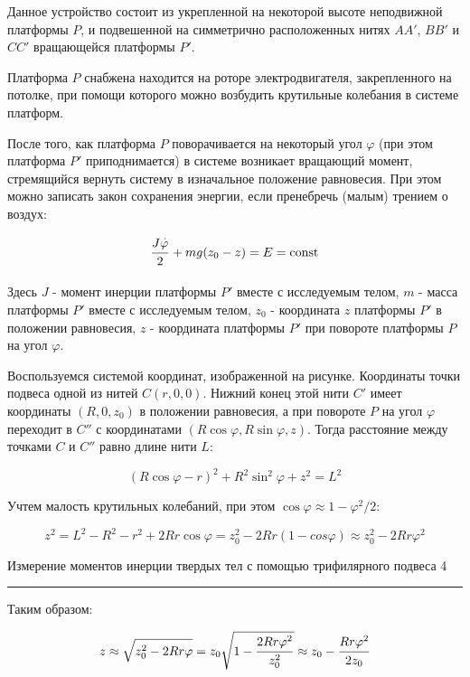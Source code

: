 \documentclass[12pt,a4paper]{scrartcl}
\begin{document}
	Данное устройство состоит из укрепленной на некоторой высоте неподвижной платформы $P$, и подвешенной на симметрично расположенных нитях $AA'$, $BB'$ и $CC'$ вращающейся платформы $P'$.
	
	Платформа $P$ снабжена находится на роторе электродвигателя, закрепленного на потолке, при помощи которого можно возбудить крутильные колебания в системе платформ.
	
	После того, как платформа $P$ поворачивается на некоторый угол $\varphi$ (при этом платформа $P'$ приподнимается) в системе возникает вращающий момент, стремящийся вернуть систему в изначальное положение равновесия. При этом можно записать закон сохранения энергии, если пренебречь (малым) трением о воздух:
	
	$$\dfrac{\strut J\overset{\,.}{\varphi}}{\strut 2} + mg(z_0 - z) = E = \mathrm{const}$$
	
	Здесь $J$ - момент инерции платформы $P'$ вместе с исследуемым телом, $m$ - масса платформы $P'$ вместе с исследуемым телом, $z_0$ - координата $z$ платформы $P'$ в положении равновесия, $z$ - координата платформы $P'$ при повороте платформы $P$ на угол $\varphi$.
	
	Воспользуемся системой координат, изображенной на рисунке. Координаты точки подвеса одной из нитей $C(r, 0, 0)$. Нижний конец этой нити $C'$ имеет координаты $(R, 0, z_0)$ в положении равновесия, а при повороте $P$ на угол $\varphi$ переходит в $C''$ с координатами $(R\cos \varphi, R\sin \varphi, z)$. Тогда расстояние между точками $C$ и $C''$ равно длине нити $L$:
	
	$$(R\cos \varphi - r)^2 + R^2 \sin^2 \varphi + z^2 = L^2$$
	
	Учтем малость крутильных колебаний, при этом $\cos \varphi \approx 1 - \varphi^2/2$:
	
	$$z^2 = L^2 - R^2 - r^2 + 2Rr\cos \varphi = z_0^2 - 2Rr(1 - cos \varphi) \approx z_0^2 - 2Rr\varphi^2$$
	
	\newpage
	
	\begin{flushleft}
		\footnotesize{Измерение моментов инерции твердых тел с помощью трифилярного подвеса} \hspace{\fill} \footnotesize{4}
		\\[-0.3cm]\noindent\rule{\textwidth}{0.3pt}
	\end{flushleft}

	Таким образом:
	
	$$z \approx \sqrt{z_0^2 - 2Rr\varphi} = z_0\sqrt{1 - \dfrac{\strut 2Rr\varphi^2}{\strut z_0^2}} \approx z_0 - \dfrac{\strut Rr\varphi^2}{\strut 2z_0}$$
	
\end{document}
